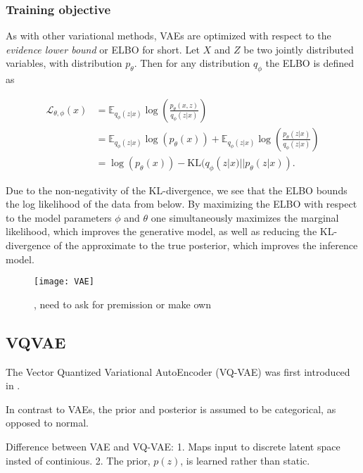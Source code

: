 \documentclass[../../thesis.tex]{subfiles}
\begin{document}
\subsubsection{Training objective}

As with other variational methods, VAEs are optimized with respect to the \textit{evidence lower bound} or ELBO for short. Let $X$ and $Z$ be two jointly distributed variables, with distribution $p_\theta$. Then for any distribution $q_\phi$ the ELBO is defined as

\begin{equation}
    \begin{aligned}
        \label{eq:ELBO}
        \mathcal{L}_{\theta,\phi}(x) 
        &= \mathbb{E}_{q_\phi(z|x)} \log \left( \frac{p_\theta(x,z)}{q_\phi(z|x)}\right) \\ 
        &=  \mathbb{E}_{q_\phi(z|x)} \log \left( p_\theta(x)\right) + \mathbb{E}_{q_\phi(z|x)} \log \left( \frac{p_\theta(z|x)}{q_\phi(z|x)}\right) \\
        &= \log \left( p_\theta(x)\right) - \textrm{KL}(q_\phi(z|x)|| p_\theta(z|x)).
    \end{aligned}
\end{equation}

Due to the non-negativity of the KL-divergence, we see that the ELBO bounds the log likelihood of the data from below. By maximizing the ELBO with respect to the model parameters $\phi$ and $\theta$ one simultaneously maximizes the marginal likelihood, which improves the generative model, as well as reducing the KL-divergence of the approximate to the true posterior, which improves the inference model.



\begin{figure}[h]
    \texttt{[image: VAE]}
    \centering  
    \caption{\cite{VAE}, need to ask for premission or make own}  
\end{figure}

\subsection{VQVAE}
The Vector Quantized Variational AutoEncoder (VQ-VAE) was first introduced in \cite{VQVAE}. 

In contrast to VAEs, the prior and posterior is assumed to be categorical, as opposed to normal. 

Difference between VAE and VQ-VAE: 1. Maps input to discrete latent space insted of continious. 2. The prior, $p(z)$, is learned rather than static.
\end{document}
